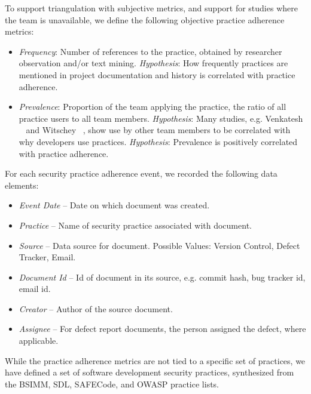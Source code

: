 To support triangulation with subjective metrics, and support for studies where the team is unavailable, we define the following objective practice adherence metrics:
\begin{itemize}
\item \textit{Frequency}: Number of references to the practice, obtained by researcher observation and/or text mining. \textit{Hypothesis}:  How frequently practices are mentioned in project documentation and history is correlated with practice adherence.
\item \textit{Prevalence}: Proportion of the team applying the practice, the ratio of all practice users to all team members. \textit{Hypothesis}: Many studies, e.g. Venkatesh ~\cite{venkatesh2003user} and Witschey ~\cite{witschey2015quantifying}, show use by other team members to be correlated with why developers use practices. \textit{Hypothesis}: Prevalence is positively correlated with practice adherence.
\end{itemize}
For each security practice adherence event, we recorded the following data elements:
\begin{itemize}
\item \textit{Event Date} – Date on which document was created.
\item \textit{Practice} – Name of security practice associated with document. 
\item \textit{Source} – Data source for document. Possible Values: Version Control, Defect Tracker, Email.
\item \textit{Document Id} – Id of document in its source, e.g. commit hash, bug tracker id, email id.
\item \textit{Creator} – Author of the source document.
\item \textit{Assignee} – For defect report documents, the person assigned the defect, where applicable.
\end{itemize}

While the practice adherence metrics are not tied to a specific set of practices, we have defined a set of software development security practices, synthesized from the BSIMM, SDL, SAFECode, and OWASP practice lists.  

